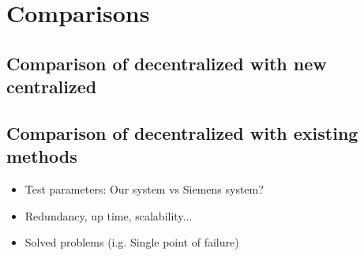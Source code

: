 \chapter{Comparisons}

\section{Comparison of decentralized with new centralized}

\section{Comparison of decentralized with existing methods}

\begin{itemize}
	\item Test parameters: Our system vs Siemens system?
	\item Redundancy, up time, scalability...
	\item Solved problems (i.g. Single point of failure)
\end{itemize}